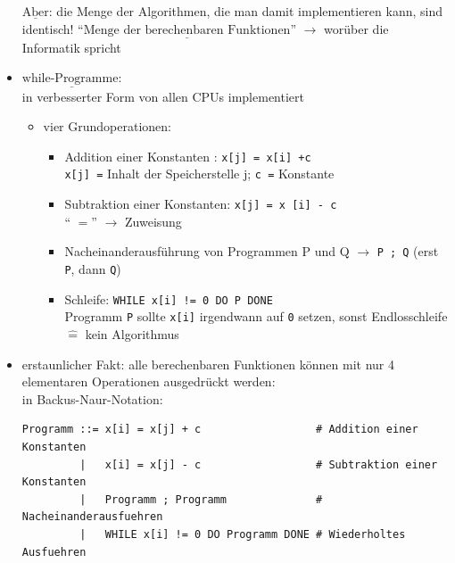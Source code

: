 \begin{itemize}[label={–}]
    $\underline{\text{Aber}}$: die Menge der Algorithmen, die man damit implementieren kann, sind identisch!
    ``$\underline{\text{Menge der berechenbaren Funktionen}}$'' $\rightarrow$ worüber die Informatik spricht



    \item $\underline{\text{while-Programme:}}$ \\
        in verbesserter Form von allen CPUs implementiert
    \begin{itemize}[label={-}]
        \item vier Grundoperationen:
        \begin{itemize}
            \item Addition einer Konstanten : \verb|x[j] = x[i] +c| \\
            \verb|x[j] =| Inhalt der Speicherstelle j; \verb|c =| Konstante
            \item Subtraktion einer Konstanten: \verb|x[j] = x [i] - c| \\
             `` $=$'' $\rightarrow$ Zuweisung
            \item Nacheinanderausführung von Programmen P und Q $\rightarrow$ \verb|P ; Q| (erst \verb|P|, dann \verb|Q|)
            \item Schleife:  \verb|WHILE x[i] != 0 DO P DONE| \\
            Programm \verb|P| sollte \verb|x[i]| irgendwann auf \verb|0| setzen, sonst Endlosschleife $\widehat{=}$ kein Algorithmus
        \end{itemize}
    \end{itemize}


    \item erstaunlicher Fakt: alle berechenbaren Funktionen können mit nur 4 elementaren Operationen ausgedrückt werden: \\
    in Backus-Naur-Notation:


    \begin{verbatim}
Programm ::= x[i] = x[j] + c                  # Addition einer Konstanten
         |   x[i] = x[j] - c                  # Subtraktion einer Konstanten
         |   Programm ; Programm              # Nacheinanderausfuehren
         |   WHILE x[i] != 0 DO Programm DONE # Wiederholtes Ausfuehren
    \end{verbatim}



\end{itemize}
